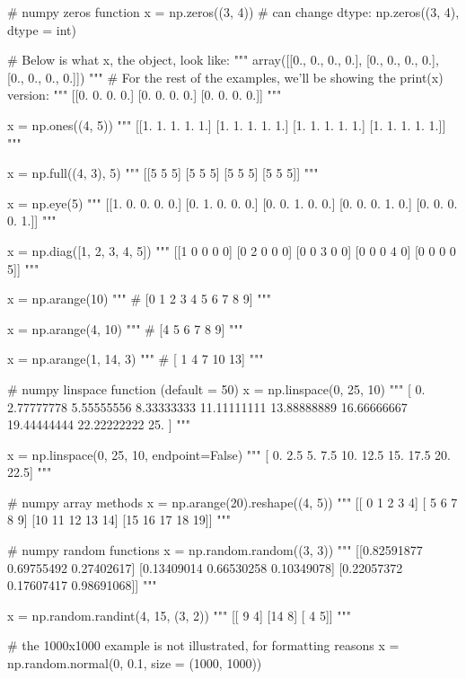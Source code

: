 \begin{python}
	# numpy zeros function
	x = np.zeros((3, 4))
	# can change dtype: np.zeros((3, 4), dtype = int)
	
	# Below is what x, the object, look like:
	"""
	array([[0., 0., 0., 0.],
	[0., 0., 0., 0.],
	[0., 0., 0., 0.]])
	"""
	# For the rest of the examples, we'll be showing the print(x) version:
	"""
	[[0. 0. 0. 0.]
	[0. 0. 0. 0.]
	[0. 0. 0. 0.]]
	"""
	
	x = np.ones((4, 5))
	"""
	[[1. 1. 1. 1. 1.]
	[1. 1. 1. 1. 1.]
	[1. 1. 1. 1. 1.]
	[1. 1. 1. 1. 1.]]
	"""
	
	x = np.full((4, 3), 5)
	"""
	[[5 5 5]
	[5 5 5]
	[5 5 5]
	[5 5 5]]
	"""
	
	x = np.eye(5)
	"""
	[[1. 0. 0. 0. 0.]
	[0. 1. 0. 0. 0.]
	[0. 0. 1. 0. 0.]
	[0. 0. 0. 1. 0.]
	[0. 0. 0. 0. 1.]]
	"""
	
	x = np.diag([1, 2, 3, 4, 5])
	"""
	[[1 0 0 0 0]
	[0 2 0 0 0]
	[0 0 3 0 0]
	[0 0 0 4 0]
	[0 0 0 0 5]]
	"""
	
	x = np.arange(10)
	"""
	# [0 1 2 3 4 5 6 7 8 9]
	"""
	
	x = np.arange(4, 10)
	"""
	# [4 5 6 7 8 9]
	"""
	
	x = np.arange(1, 14, 3)
	"""
	# [ 1  4  7 10 13]
	"""
	
	# numpy linspace function (default = 50)
	x = np.linspace(0, 25, 10)
	"""
	[ 0.          2.77777778  5.55555556  8.33333333 11.11111111 13.88888889
	16.66666667 19.44444444 22.22222222 25.        ]
	"""
	
	x = np.linspace(0, 25, 10, endpoint=False)
	"""
	[ 0.   2.5  5.   7.5 10.  12.5 15.  17.5 20.  22.5]
	"""
	
	# numpy array methods
	x = np.arange(20).reshape((4, 5))
	"""
	[[ 0  1  2  3  4]
	[ 5  6  7  8  9]
	[10 11 12 13 14]
	[15 16 17 18 19]]
	"""
	
	# numpy random functions
	x = np.random.random((3, 3))
	"""
	[[0.82591877 0.69755492 0.27402617]
	[0.13409014 0.66530258 0.10349078]
	[0.22057372 0.17607417 0.98691068]]
	"""
	
	x = np.random.randint(4, 15, (3, 2))
	"""
	[[ 9  4]
	[14  8]
	[ 4  5]]
	"""
	
	# the 1000x1000 example is not illustrated, for formatting reasons
	x = np.random.normal(0, 0.1, size = (1000, 1000))
	
\end{python}









